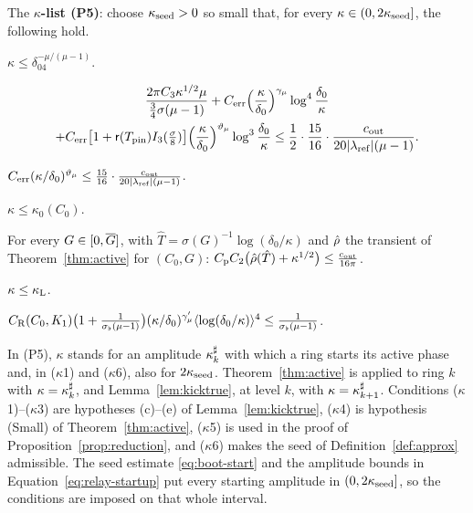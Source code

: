 \begin{definition}
\label{def:P5}
The \textbf{$\kappa$-list (P5)}: choose $\kappa_{\mathrm{seed}}>0$ so small that, for every
$\kappa\in(0,2\kappa_{\mathrm{seed}}]$, the following hold.
\begin{description}[font=\normalfont]
\item[\textup{($\kappa$1)}] $\kappa\le\delta_04^{-\mu/(\mu-1)}$.
\item[\textup{($\kappa$2)}] \begin{multline*}
  \frac{2\pi C_3\kappa^{1/2}\mu}{\frac34\sigma(\mu-1)}+C_{\mathrm{err}}\Big(\frac\kappa{\delta_0}\Big)^{\gamma_\mu}\log^4\frac{\delta_0}\kappa\\
  +C_{\mathrm{err}}\big[1+\mathsf{r}(T_{\mathrm{pin}})I_{3}(\tfrac\sigma8)\big]\Big(\frac\kappa{\delta_0}\Big)^{\vartheta_\mu}\log^3\frac{\delta_0}\kappa
  \le\frac12\cdot\frac{15}{16}\cdot\frac{c_{\mathrm{out}}}{20|\lambda_{\mathrm{ref}}|(\mu-1)}.
  \end{multline*}
\item[\textup{($\kappa$3)}] $C_{\mathrm{err}}(\kappa/\delta_0)^{\vartheta_\mu}\le\frac{15}{16}\cdot\frac{c_{\mathrm{out}}}{20|\lambda_{\mathrm{ref}}|(\mu-1)}$.
\item[\textup{($\kappa$4)}] $\kappa\le\kappa_0(C_0)$.
\item[\textup{($\kappa$5)}] For every $G\in[0,\overline{G}]$, with $\hat T=\sigma(G)^{-1}\log(\delta_0/\kappa)$
  and $\hat\rho$ the transient of Theorem~\ref{thm:active} for $(C_0,G)$:
  $C_{\mathrm{p}} C_2\big(\hat\rho(\hat T)+\kappa^{1/2}\big)\le\frac{c_{\mathrm{out}}}{16\pi}$.
\item[\textup{($\kappa$6)}] $\kappa\le\kappa_{\mathrm{L}}$.
\item[\textup{($\kappa$7)}] $C_{\mathrm R}(C_0,K_1)\big(1+\frac1{\sigma_\flat(\mu-1)}\big)(\kappa/\delta_0)^{\gamma'_\mu}\langle\log(\delta_0/\kappa)\rangle^4\le\frac1{\sigma_\flat(\mu-1)}$.
\end{description}
\end{definition}

In (P5), $\kappa$ stands for an amplitude $\kappa^\sharp_k$ with which a ring starts its
active phase and, in ($\kappa$1) and ($\kappa$6), also for $2\kappa_{\mathrm{seed}}$.
Theorem~\ref{thm:active} is applied to ring $k$ with $\kappa=\kappa^\sharp_k$, and
Lemma~\ref{lem:kicktrue}, at level $k$, with $\kappa=\kappa^\sharp_{k+1}$.
Conditions ($\kappa$1)--($\kappa$3) are hypotheses (c)--(e) of
Lemma~\ref{lem:kicktrue}, ($\kappa$4) is hypothesis (Small) of
Theorem~\ref{thm:active}, ($\kappa$5) is used in the proof of
Proposition~\ref{prop:reduction}, and ($\kappa$6) makes the seed of
Definition~\ref{def:approx} admissible. The seed estimate
\eqref{eq:boot-start} and the amplitude bounds in Equation~\eqref{eq:relay-startup}
put every starting amplitude
in $(0,2\kappa_{\mathrm{seed}}]$, so the conditions are imposed on that whole interval.

